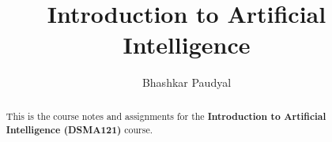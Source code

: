\documentclass[a4paper, 11pt]{report}
\author{Bhashkar Paudyal}
\title{Introduction to Artificial Intelligence}
\begin{document}
\maketitle
\begin{abstract}
  This is the course notes and assignments for the \textbf{Introduction to
  Artificial Intelligence (DSMA121)} course.
\end{abstract}
\newpage
\tableofcontents
\newpage
\appendix
\appendixpage{}



\newpage
\pagestyle{plain}
\printbibliography{}
\end{document}
